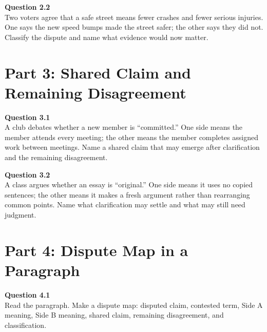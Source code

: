 \documentclass[12pt]{article}
\begin{document}
\textbf{Question 2.2}\\[-0.15em]
Two voters agree that a safe street means fewer crashes and fewer serious injuries. One says the new speed bumps made the street safer; the other says they did not. Classify the dispute and name what evidence would now matter.


\newpage

\section*{Part 3: Shared Claim and Remaining Disagreement}

\textbf{Question 3.1}\\[-0.15em]
A club debates whether a new member is ``committed.'' One side means the member attends every meeting; the other means the member completes assigned work between meetings. Name a shared claim that may emerge after clarification and the remaining disagreement.


\textbf{Question 3.2}\\[-0.15em]
A class argues whether an essay is ``original.'' One side means it uses no copied sentences; the other means it makes a fresh argument rather than rearranging common points. Name what clarification may settle and what may still need judgment.


\newpage

\section*{Part 4: Dispute Map in a Paragraph}

\textbf{Question 4.1}\\[-0.15em]
Read the paragraph. Make a dispute map: disputed claim, contested term, Side A meaning, Side B meaning, shared claim, remaining disagreement, and classification.

\vspace{0.2em}

\noindent{}
\end{document}
